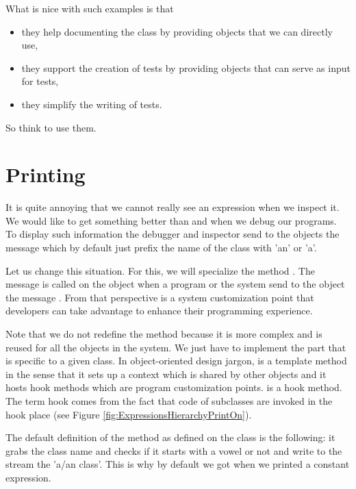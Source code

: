 \documentclass[10pt,twoside,english]{_support/latex/sbabook/sbabook}
\begin{document}
What is nice with such examples is that 

\begin{itemize}
\item they help documenting the class by providing objects that we can directly use,
\item they support the creation of tests by providing objects that can serve as input for tests,
\item they simplify the writing of tests. 
\end{itemize}

So think to use them. 
\section{Printing}
It is quite annoying that we cannot really see an expression when we inspect it. We would like to get something better than  and  when we debug our programs.
To display such information the debugger and inspector send to the objects the message  which by default just prefix the name of the class with 'an' or 'a'. 

Let us change this situation. For this, we will specialize the method . The message  is called on the object when a program or the system send to the object the message . From that perspective  is a system customization point that developers can take advantage to enhance their programming experience.

Note that we do not redefine the method  because it is more complex and  is reused for all the objects in the system. We just have to implement the part that is specific to a given class. In object-oriented design jargon,  is a template method in the sense that it sets up a context which is shared by other objects and it hosts hook methods which are program customization points.  is a hook method. The term hook comes from the fact that code of subclasses are invoked in the hook place (see Figure \ref{fig:ExpressionsHierarchyPrintOn}).

The default definition of the method  as defined on the class  is the following: it grabs the class name and checks if it starts with a vowel or not and write to the stream the 'a/an class'. This is why by default we got  when we printed a constant expression. 
\end{document}

